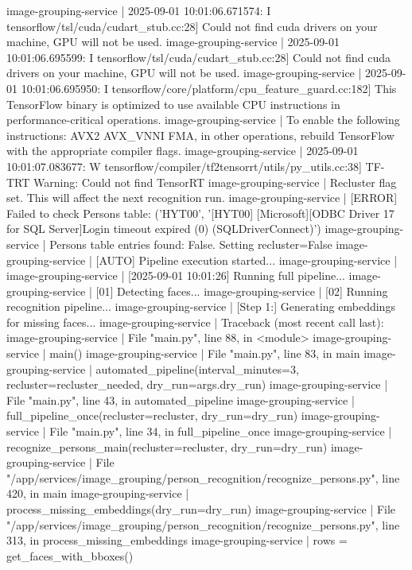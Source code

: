 image-grouping-service  | 2025-09-01 10:01:06.671574: I tensorflow/tsl/cuda/cudart_stub.cc:28] Could not find cuda drivers on your machine, GPU will not be used.
image-grouping-service  | 2025-09-01 10:01:06.695599: I tensorflow/tsl/cuda/cudart_stub.cc:28] Could not find cuda drivers on your machine, GPU will not be used.
image-grouping-service  | 2025-09-01 10:01:06.695950: I tensorflow/core/platform/cpu_feature_guard.cc:182] This TensorFlow binary is optimized to use available CPU instructions in performance-critical operations.
image-grouping-service  | To enable the following instructions: AVX2 AVX_VNNI FMA, in other operations, rebuild TensorFlow with the appropriate compiler flags.
image-grouping-service  | 2025-09-01 10:01:07.083677: W tensorflow/compiler/tf2tensorrt/utils/py_utils.cc:38] TF-TRT Warning: Could not find TensorRT
image-grouping-service  | Recluster flag set. This will affect the next recognition run.
image-grouping-service  | [ERROR] Failed to check Persons table: ('HYT00', '[HYT00] [Microsoft][ODBC Driver 17 for SQL Server]Login timeout expired (0) (SQLDriverConnect)')
image-grouping-service  | Persons table entries found: False. Setting recluster=False
image-grouping-service  | [AUTO] Pipeline execution started...
image-grouping-service  |
image-grouping-service  | [2025-09-01 10:01:26] Running full pipeline...
image-grouping-service  | [01] Detecting faces...
image-grouping-service  | [02] Running recognition pipeline...
image-grouping-service  | [Step 1:] Generating embeddings for missing faces...
image-grouping-service  | Traceback (most recent call last):
image-grouping-service  |   File "main.py", line 88, in <module>
image-grouping-service  |     main()
image-grouping-service  |   File "main.py", line 83, in main
image-grouping-service  |     automated_pipeline(interval_minutes=3, recluster=recluster_needed, dry_run=args.dry_run)
image-grouping-service  |   File "main.py", line 43, in automated_pipeline
image-grouping-service  |     full_pipeline_once(recluster=recluster, dry_run=dry_run)
image-grouping-service  |   File "main.py", line 34, in full_pipeline_once
image-grouping-service  |     recognize_persons_main(recluster=recluster, dry_run=dry_run)
image-grouping-service  |   File "/app/services/image_grouping/person_recognition/recognize_persons.py", line 420, in main
image-grouping-service  |     process_missing_embeddings(dry_run=dry_run)
image-grouping-service  |   File "/app/services/image_grouping/person_recognition/recognize_persons.py", line 313, in process_missing_embeddings
image-grouping-service  |     rows = get_faces_with_bboxes()
